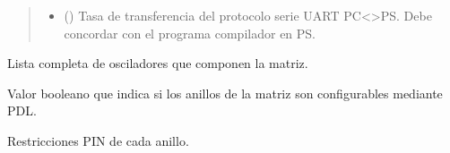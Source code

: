 \documentclass[letterpaper,10pt,english]{sphinxmanual}
\begin{document}
\begin{fulllineitems}
\begin{fulllineitems}
\begin{quote}
\begin{description}
\begin{itemize}
\item {} 
\sphinxAtStartPar
{} (\sphinxstyleliteralemphasis{\sphinxupquote{, }}) \textendash{} Tasa de transferencia del protocolo serie UART PC\textless{}\textendash{}\textgreater{}PS. Debe concordar con el programa compilador en PS.

\end{itemize}

\end{description}\end{quote}

\end{fulllineitems}


\begin{fulllineitems}
\label{\detokenize{fpga.ring_osc:fpga.ring_osc.StdMatrix.osc_list}}
\pysigstartsignatures
{}
\pysigstopsignatures
\sphinxAtStartPar
Lista completa de osciladores que componen la matriz.

\end{fulllineitems}


\begin{fulllineitems}
\label{\detokenize{fpga.ring_osc:fpga.ring_osc.StdMatrix.pdl}}
\pysigstartsignatures
{}
\pysigstopsignatures
\sphinxAtStartPar
Valor booleano que indica si los anillos de la matriz son configurables mediante PDL.

\end{fulllineitems}


\begin{fulllineitems}
\label{\detokenize{fpga.ring_osc:fpga.ring_osc.StdMatrix.pin}}
\pysigstartsignatures
{}
\pysigstopsignatures
\sphinxAtStartPar
Restricciones PIN de cada anillo.

\end{fulllineitems}


\end{fulllineitems}
\end{document}
